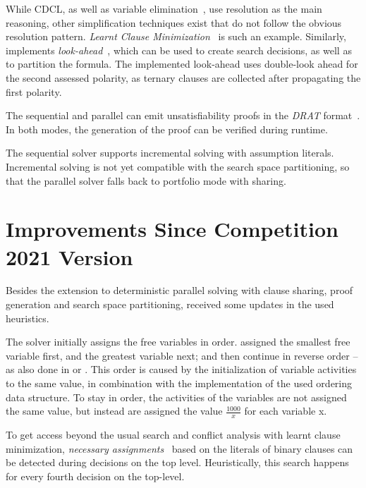 \documentclass[conference]{IEEEtran}
\begin{document}
While CDCL, as well as variable elimination~\cite{EenB:2005}, use resolution as the main reasoning, other simplification techniques exist that do not follow the obvious resolution pattern.
\emph{Learnt Clause Minimization}~\cite{ijcai2017-98} is such an example.
Similarly, \mergesat implements \emph{look-ahead}~\cite{DBLP:series/faia/HeuleM09}, which can be used to create search decisions, as well as to partition the formula.
The implemented look-ahead uses double-look ahead for the second assessed polarity, as ternary clauses are collected after propagating the first polarity.

The sequential and parallel \mergesat can emit unsatisfiability proofs in the \emph{DRAT} format~\cite{drat}.
In both modes, the generation of the proof can be verified during runtime.

The sequential solver supports incremental solving with assumption literals.
Incremental solving is not yet compatible with the search space partitioning, so that the
parallel solver falls back to portfolio mode with sharing.

\section{Improvements Since Competition 2021 Version}

Besides the extension to deterministic parallel solving with clause sharing, proof generation and search space partitioning, \mergesat received some updates in the used heuristics.

The solver \cadical initially assigns the free variables in order. \mergesat assigned the smallest free variable first, and the greatest variable next; and then continue in reverse order -- as also done in \minisat or \glucose.
This order is caused by the initialization of variable activities to the same value, in
combination with the implementation of the used ordering data structure.
To stay in order, the activities of the variables are not assigned the same value, but instead are assigned the value $\frac{1000}{x}$ for each variable x.

To get access beyond the usual search and conflict analysis with learnt clause minimization, \emph{necessary assignments}~\cite{probing} based on the literals of binary clauses can be detected during decisions on the top level. Heuristically, this search happens for every fourth decision on the top-level.
\end{document}
